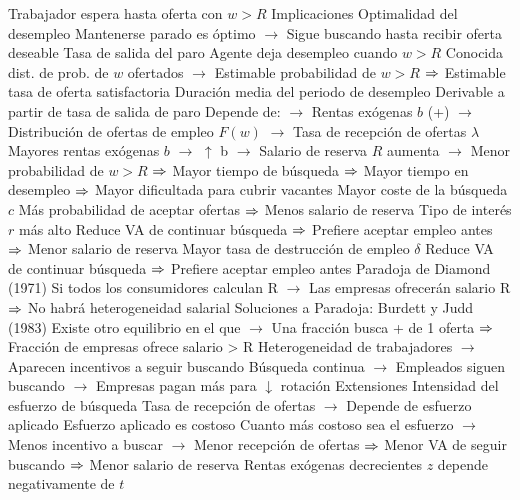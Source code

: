 \documentclass{nuevotema}
\begin{document}
\begin{esquemal}
				\4[$\then$] 
				\4[$\then$] Trabajador espera hasta oferta con $w>R$
			\3 Implicaciones
				\4 Optimalidad del desempleo
				\4[] Mantenerse parado es óptimo
				\4[] $\to$ Sigue buscando hasta recibir oferta deseable
				\4 Tasa de salida del paro
				\4[] Agente deja desempleo cuando $w>R$
				\4[] Conocida dist. de prob. de $w$ ofertados
				\4[] $\to$ Estimable probabilidad de $w>R$
				\4[] $\then$ Estimable tasa de oferta satisfactoria
				\4 Duración media del periodo de desempleo
				\4[] Derivable a partir de tasa de salida de paro
				\4[] Depende de:
				\4[] $\to$ Rentas exógenas $b$ (+)
				\4[] $\to$ Distribución de ofertas de empleo $F(w)$
				\4[] $\to$ Tasa de recepción de ofertas $\lambda$
				\4 Mayores rentas exógenas $b$
				\4[] $\to$ $\uparrow$ b $\to$ Salario de reserva $R$ aumenta
				\4[] $\to$ Menor probabilidad de $w>R$
				\4[] $\then$ Mayor tiempo de búsqueda
				\4[] $\then$ Mayor tiempo en desempleo
				\4[] $\then$ Mayor dificultada para cubrir vacantes
				\4 Mayor coste de la búsqueda $c$
				\4[] Más probabilidad de aceptar ofertas
				\4[] $\then$ Menos salario de reserva
				\4 Tipo de interés $r$ más alto
				\4[] Reduce VA de continuar búsqueda
				\4[] $\then$ Prefiere aceptar empleo antes
				\4[] $\then$ Menor salario de reserva
				\4 Mayor tasa de destrucción de empleo $\delta$
				\4[] Reduce VA de continuar búsqueda
				\4[] $\then$ Prefiere aceptar empleo antes
				\4 Paradoja de Diamond (1971)
				\4[] Si todos los consumidores calculan R
				\4[] $\to$ Las empresas ofrecerán salario R
				\4[] $\then$ No habrá heterogeneidad salarial
				\4 Soluciones a Paradoja:
				\4[] Burdett y Judd (1983)
				\4[] Existe otro equilibrio en el que
				\4[] $\to$ Una fracción busca + de 1 oferta
				\4[] $\then$ Fracción de empresas ofrece salario > R
				\4[] Heterogeneidad de trabajadores
				\4[] $\to$ Aparecen incentivos a seguir buscando
				\4[] Búsqueda continua
				\4[] $\to$ Empleados siguen buscando
				\4[] $\to$ Empresas pagan más para $\downarrow$ rotación
			\3 Extensiones
				\4 Intensidad del esfuerzo de búsqueda
				\4[] Tasa de recepción de ofertas
				\4[] $\to$ Depende de esfuerzo aplicado
				\4[] Esfuerzo aplicado es costoso
				\4[] Cuanto más costoso sea el esfuerzo
				\4[] $\to$ Menos incentivo a buscar
				\4[] $\to$ Menor recepción de ofertas
				\4[] $\then$ Menor VA de seguir buscando
				\4[] $\then$ Menor salario de reserva
				\4 Rentas exógenas decrecientes
				\4[] $z$ depende negativamente de $t$

\end{esquemal}
\end{document}
